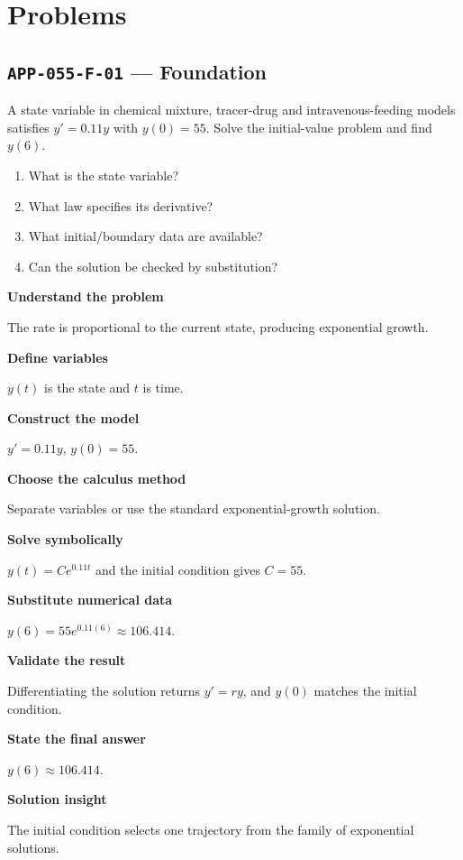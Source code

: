 \documentclass[11pt]{book}
\newcommand{\pid}[1]{\texttt{#1}}
\begin{document}
\section*{Problems}
\subsection*{\pid{APP-055-F-01} — Foundation}
\begin{problembox}
A state variable in chemical mixture, tracer-drug and intravenous-feeding models satisfies $y'=0.11y$ with $y(0)=55$. Solve the initial-value problem and find $y(6)$.
\end{problembox}
\begin{promptbox}\begin{enumerate}
\item What is the state variable?
\item What law specifies its derivative?
\item What initial/boundary data are available?
\item Can the solution be checked by substitution?
\end{enumerate}\end{promptbox}
\begin{solutionbox}
\textbf{Understand the problem}\par The rate is proportional to the current state, producing exponential growth.\par\medskip
\textbf{Define variables}\par $y(t)$ is the state and $t$ is time.\par\medskip
\textbf{Construct the model}\par $y'=0.11y$, $y(0)=55$.\par\medskip
\textbf{Choose the calculus method}\par Separate variables or use the standard exponential-growth solution.\par\medskip
\textbf{Solve symbolically}\par $y(t)=Ce^{0.11t}$ and the initial condition gives $C=55$.\par\medskip
\textbf{Substitute numerical data}\par $y(6)=55e^{0.11(6)}\approx 106.414$.\par\medskip
\textbf{Validate the result}\par Differentiating the solution returns $y'=ry$, and $y(0)$ matches the initial condition.\par\medskip
\textbf{State the final answer}\par $y(6)\approx 106.414$.\par\medskip
\textbf{Solution insight}\par The initial condition selects one trajectory from the family of exponential solutions.\par\medskip
\end{solutionbox}
\end{document}
